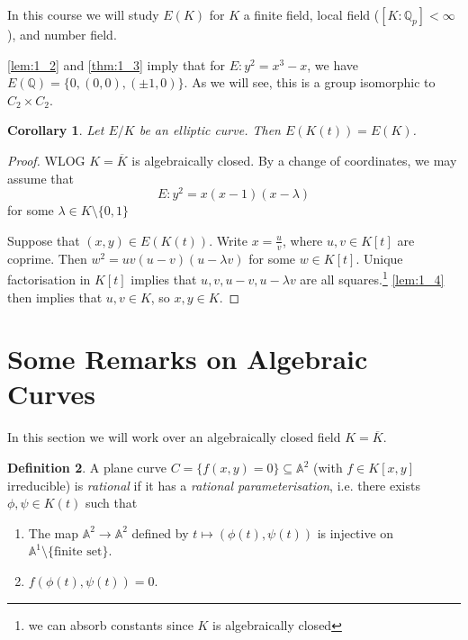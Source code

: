 \documentclass[11pt]{article}
\theoremstyle{definition}
\newtheorem{definition}{Definition}[section]
\theoremstyle{plain}
\newtheorem{corollary}[definition]{Corollary}
\theoremstyle{remark}
\newcommand{\QQ}{\mathbb{Q}}
\newcommand{\bA}{\mathbb{A}}
\begin{document}
In this course we will study $E(K)$ for $K$ a finite field, local field ($[K : \QQ_p] < \infty$), and number field.

\autoref{lem:1_2} and \autoref{thm:1_3} imply that for $E : y^2 = x^3 - x$, we have $E(\QQ) = \{0, (0, 0), (\pm 1, 0)\}$. As we will see, this is a group isomorphic to $C_2 \times C_2$.

\begin{corollary}\label{cor:1_6}
    Let $E/K$ be an elliptic curve. Then $E(K(t)) = E(K)$.
\end{corollary}
\begin{proof}
    WLOG $K = \overline{K}$ is algebraically closed. By a change of coordinates, we may assume that
    \begin{equation*}
        E : y^2 = x(x-1)(x-\lambda)
    \end{equation*}
    for some $\lambda \in K \setminus \{0, 1\}$

    Suppose that $(x, y) \in E(K(t))$. Write $x = \frac{u}{v}$, where $u, v \in K[t]$ are coprime. Then $w^2 = uv(u-v)(u-\lambda v)$ for some $w \in K[t]$. Unique factorisation in $K[t]$ implies that $u, v, u-v, u-\lambda v$ are all squares.\footnote{we can absorb constants since $K$ is algebraically closed} \autoref{lem:1_4} then implies that $u, v \in K$, so $x, y \in K$.
\end{proof}

\section{Some Remarks on Algebraic Curves}

In this section we will work over an algebraically closed field $K = \overline{K}$.

\begin{definition}\label{def:2_1}
    A plane curve $C = \{f(x, y) = 0\} \subseteq \bA^2$ (with $f \in K[x, y]$ irreducible) is \emph{rational} if it has a \emph{rational parameterisation}, i.e. there exists $\phi, \psi \in K(t)$ such that
    \begin{enumerate}
        \item The map $\bA^2 \to \bA^2$ defined by $t \mapsto (\phi(t), \psi(t))$ is injective on $\bA^1 \setminus \{\text{finite set}\}$.
        \item $f(\phi(t), \psi(t)) = 0$.
    \end{enumerate}
\end{definition}
\end{document}
